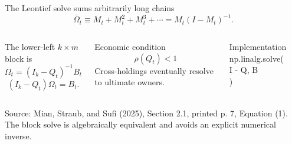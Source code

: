 \documentclass[aspectratio=169,11pt]{beamer}
\newcommand{\source}[1]{%
  \vfill
  {\color{MSSGray}\fontsize{6.5}{7.5}\selectfont #1\par}
}
\begin{document}
\begin{frame}{The Leontief solve sums arbitrarily long chains}
  \[
    \bar\Omega_t
    \equiv
    M_t+M_t^2+M_t^3+\cdots
    =
    M_t(I-M_t)^{-1}.
    \tag{1}
  \]
  \begin{columns}[T,onlytextwidth]
    The lower-left \(k\times m\) block is
    \[
      \boxed{
      \Omega_t=(I_k-Q_t)^{-1}B_t
      }
    \]
    \[
      (I_k-Q_t)\Omega_t=B_t.
    \]

    \begin{block}{Economic condition}
      \[
        \rho(Q_t)<1
      \]
      Cross-holdings eventually resolve to ultimate owners.
    \end{block}
    \begin{block}{Implementation}
      \ttfamily\small
      np.linalg.solve(\\
      \quad I - Q, B\\
      )
    \end{block}
  \end{columns}
  \source{Source: Mian, Straub, and Sufi (2025), Section 2.1, printed p. 7, Equation (1). The block solve is algebraically equivalent and avoids an explicit numerical inverse.}
\end{frame}
\end{document}
